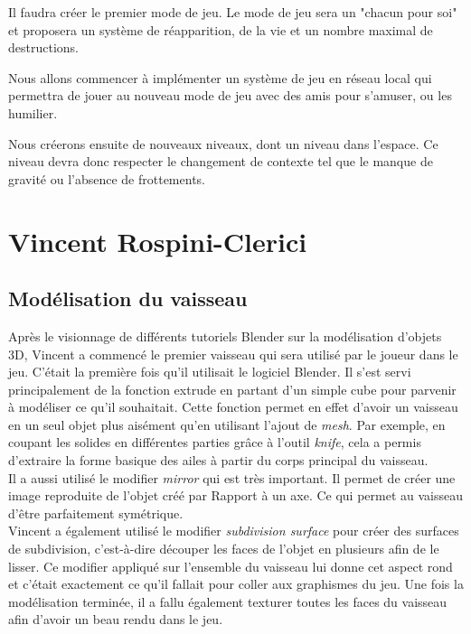 \documentclass[10pt, titlepage]{report}
\begin{document}
Il faudra créer le premier mode de jeu. Le mode de jeu sera un "chacun pour soi" et proposera un système de réapparition, de la vie et un nombre maximal de destructions.

Nous allons commencer à implémenter un système de jeu en réseau local qui permettra de jouer au nouveau mode de jeu avec des amis pour s'amuser, ou les humilier.

Nous créerons ensuite de nouveaux niveaux, dont un niveau dans l'espace. Ce niveau devra donc respecter le changement de contexte tel que le manque de gravité ou l'absence de frottements.

\section{Vincent Rospini-Clerici}

\subsection{Modélisation du vaisseau}

Après le visionnage de différents tutoriels Blender sur la modélisation d'objets 3D, Vincent a commencé le premier vaisseau qui sera utilisé par le joueur dans le jeu. C'était la première fois qu'il utilisait le logiciel Blender. Il s'est servi principalement de la fonction extrude en partant d'un simple cube pour parvenir à modéliser ce qu'il souhaitait. Cette fonction permet en effet d'avoir un vaisseau en un seul objet plus aisément qu'en utilisant l'ajout de \textit{mesh}. Par exemple, en coupant les solides en différentes parties grâce à l'outil \textit{knife}, cela a permis d'extraire la forme basique des ailes à partir du corps principal du vaisseau.\\

Il a aussi utilisé le modifier \textit{mirror} qui est très important. Il permet de créer une image reproduite de l’objet créé par Rapport à un axe. Ce qui permet au vaisseau d'être parfaitement symétrique.\\

Vincent a également utilisé le modifier \textit{subdivision surface} pour créer des surfaces de subdivision, c’est-à-dire découper les faces de l’objet en plusieurs afin de le lisser. Ce modifier appliqué sur l’ensemble du vaisseau lui donne cet aspect rond et c’était exactement ce qu’il fallait pour coller aux graphismes du jeu.
Une fois la modélisation terminée, il a fallu également texturer toutes les faces du vaisseau afin d'avoir un beau rendu dans le jeu.\\
\end{document}
